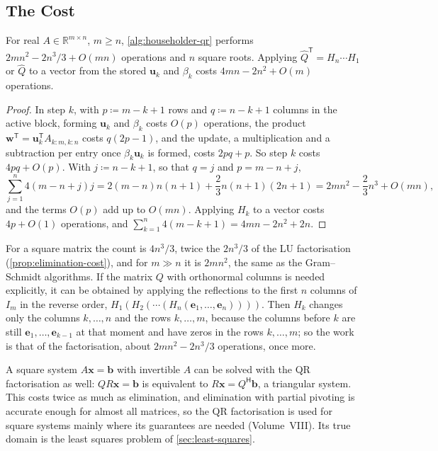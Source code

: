 \subsection{The Cost}

\begin{proposition}
\label{prop:householder-cost}
For real $A\in\mathbb R^{m\times n}$, $m\ge n$, \cref{alg:householder-qr} performs $2mn^2-2n^3/3+O(mn)$ operations and $n$ square roots. Applying $\hat Q^{\mathsf T}=H_n\cdots H_1$ or $\hat Q$ to a vector from the stored $\mathbf u_k$ and $\beta_k$ costs $4mn-2n^2+O(m)$ operations.
\end{proposition}

\begin{proof}
In step $k$, with $p\coloneqq m-k+1$ rows and $q\coloneqq n-k+1$ columns in the active block, forming $\mathbf u_k$ and $\beta_k$ costs $O(p)$ operations, the product $\mathbf w^{\mathsf T}=\mathbf u_k^{\mathsf T}A_{k:m,k:n}$ costs $q(2p-1)$, and the update, a multiplication and a subtraction per entry once $\beta_k\mathbf u_k$ is formed, costs $2pq+p$. So step $k$ costs $4pq+O(p)$. With $j\coloneqq n-k+1$, so that $q=j$ and $p=m-n+j$,
\[
\sum_{j=1}^n4(m-n+j)j=2(m-n)n(n+1)+\frac23n(n+1)(2n+1)=2mn^2-\frac23n^3+O(mn),
\]
and the terms $O(p)$ add up to $O(mn)$. Applying $H_k$ to a vector costs $4p+O(1)$ operations, and $\sum_{k=1}^n4(m-k+1)=4mn-2n^2+2n$.
\end{proof}

For a square matrix the count is $4n^3/3$, twice the $2n^3/3$ of the LU factorisation (\cref{prop:elimination-cost}), and for $m\gg n$ it is $2mn^2$, the same as the Gram--Schmidt algorithms. If the matrix $Q$ with orthonormal columns is needed explicitly, it can be obtained by applying the reflections to the first $n$ columns of $I_m$ in the reverse order, $H_1(H_2(\cdots(H_n(\mathbf e_1,\ldots,\mathbf e_n))))$. Then $H_k$ changes only the columns $k,\ldots,n$ and the rows $k,\ldots,m$, because the columns before $k$ are still $\mathbf e_1,\ldots,\mathbf e_{k-1}$ at that moment and have zeros in the rows $k,\ldots,m$; so the work is that of the factorisation, about $2mn^2-2n^3/3$ operations, once more.

A square system $A\mathbf x=\mathbf b$ with invertible $A$ can be solved with the QR factorisation as well: $QR\mathbf x=\mathbf b$ is equivalent to $R\mathbf x=Q^{\mathsf H}\mathbf b$, a triangular system. This costs twice as much as elimination, and elimination with partial pivoting is accurate enough for almost all matrices, so the QR factorisation is used for square systems mainly where its guarantees are needed (Volume~VIII). Its true domain is the least squares problem of \cref{sec:least-squares}.

